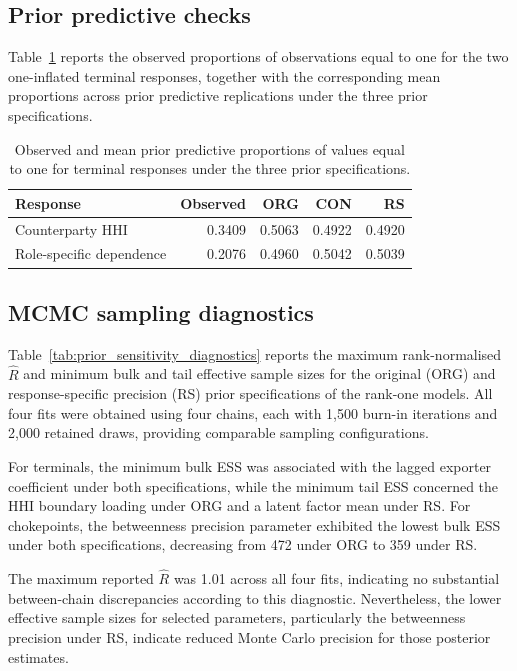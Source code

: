 \documentclass[pdftex,12pt,openright,a4paper,oneside]{book}
\begin{document}
\subsection{Prior predictive checks}
\label{app:prior_predictive}

Table~\ref{tab:prior_predictive_boundary} reports
the observed proportions of observations equal to one
for the two one-inflated terminal responses,
together with the corresponding mean proportions
across prior predictive replications under the
three prior specifications.

\begin{table}[htbp]
\centering
\caption{Observed and mean prior predictive proportions
of values equal to one for terminal responses under
the three prior specifications.}
\label{tab:prior_predictive_boundary}
\begin{tabular}{lrrrr}
\toprule
Response & Observed & ORG & CON & RS \\
\midrule
Counterparty HHI
    & 0.3409 & 0.5063 & 0.4922 & 0.4920 \\
Role-specific dependence
    & 0.2076 & 0.4960 & 0.5042 & 0.5039 \\
\bottomrule
\end{tabular}
\end{table}

\subsection{MCMC sampling diagnostics}
\label{app:prior_sensitivity_diagnostics}

Table~\ref{tab:prior_sensitivity_diagnostics} reports the maximum rank-normalised $\widehat{R}$ and minimum bulk and tail effective sample sizes for the original (ORG) and response-specific precision (RS) prior specifications of the rank-one models. 
All four fits were obtained using four chains, each with 1,500 burn-in iterations and 2,000 retained draws, providing comparable sampling configurations.

For terminals, the minimum bulk ESS was associated with the lagged exporter coefficient under both specifications, while the minimum tail ESS concerned the HHI boundary loading under ORG and a latent factor mean under RS. 
For chokepoints, the betweenness precision parameter exhibited the lowest bulk ESS under both specifications, decreasing from 472 under ORG to 359 under RS. 

The maximum reported $\widehat{R}$ was 1.01 across all four fits, indicating no substantial between-chain discrepancies according to this diagnostic. 
Nevertheless, the lower effective sample sizes for selected parameters, particularly the betweenness precision under RS, indicate reduced Monte Carlo precision for those posterior estimates.
\end{document}
